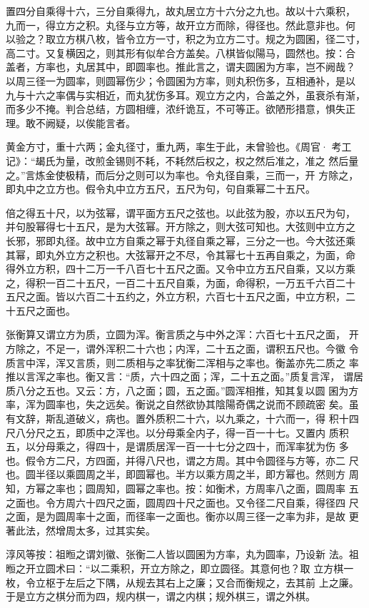 \documentclass[a4paper,12pt,UTF8,twoside]{ctexbook}
\begin{document}
置四分自乘得十六，三分自乘得九，故丸居立方十六分之九也。故以十六乘积， 九而一，得立方之积。丸径与立方等，故开立方而除，得径也。然此意非也。何 以验之？取立方棋八枚，皆令立方一寸，积之为立方二寸。规之为圆囷，径二寸， 高二寸。又复横因之，则其形有似牟合方盖矣。八棋皆似陽马，圆然也。按：合 盖者，方率也，丸居其中，即圆率也。推此言之，谓夫圆囷为方率，岂不阙哉？ 以周三径一为圆率，则圆幂伤少；令圆囷为方率，则丸积伤多，互相通补，是以 九与十六之率偶与实相近，而丸犹伤多耳。观立方之内，合盖之外，虽衰杀有渐， 而多少不掩。判合总结，方圆相缠，浓纤诡互，不可等正。欲陋形措意，惧失正 理。敢不阙疑，以俟能言者。

黄金方寸，重十六两；金丸径寸，重九两，率生于此，未曾验也。《周官· 考工记》：“朅氏为量，改煎金锡则不耗，不耗然后权之，权之然后准之，准之 然后量之。”言炼金使极精，而后分之则可以为率也。令丸径自乘，三而一，开 方除之，即丸中之立方也。假令丸中立方五尺，五尺为句，句自乘幂二十五尺。

倍之得五十尺，以为弦幂，谓平面方五尺之弦也。以此弦为股，亦以五尺为句， 并句股幂得七十五尺，是为大弦幂。开方除之，则大弦可知也。大弦则中立方之 长邪，邪即丸径。故中立方自乘之幂于丸径自乘之幂，三分之一也。今大弦还乘 其幂，即丸外立方之积也。大弦幂开之不尽，令其幂七十五再自乘之，为面，命 得外立方积，四十二万一千八百七十五尺之面。又令中立方五尺自乘，又以方乘 之，得积一百二十五尺，一百二十五尺自乘，为面，命得积，一万五千六百二十 五尺之面。皆以六百二十五约之，外立方积，六百七十五尺之面，中立方积，二 十五尺之面也。

张衡算又谓立方为质，立圆为浑。衡言质之与中外之浑：六百七十五尺之面， 开方除之，不足一，谓外浑积二十六也；内浑，二十五之面，谓积五尺也。今徽 令质言中浑，浑又言质，则二质相与之率犹衡二浑相与之率也。衡盖亦先二质之 率推以言浑之率也。衡又言：“质，六十四之面；浑，二十五之面。”质复言浑， 谓居质八分之五也。又云：方，八之面；圆，五之面。”圆浑相推，知其复以圆 囷为方率，浑为圆率也，失之远矣。衡说之自然欲协其陰陽奇偶之说而不顾疏密 矣。虽有文辞，斯乱道破义，病也。置外质积二十六，以九乘之，十六而一，得 积十四尺八分尺之五，即质中之浑也。以分母乘全内子，得一百一十七。又置内 质积五，以分母乘之，得四十，是谓质居浑一百一十七分之四十，而浑率犹为伤 多也。假令方二尺，方四面，并得八尺也，谓之方周。其中令圆径与方等，亦二 尺也。圆半径以乘圆周之半，即圆幂也。半方以乘方周之半，即方幂也。然则方 周知，方幂之率也；圆周知，圆幂之率也。按：如衡术，方周率八之面，圆周率 五之面也。令方周六十四尺之面，圆周四十尺之面也。又令径二尺自乘，得径四 尺之面，是为圆周率十之面，而径率一之面也。衡亦以周三径一之率为非，是故 更著此法，然增周太多，过其实矣。

淳风等按：祖暅之谓刘徽、张衡二人皆以圆囷为方率，丸为圆率，乃设新 法。祖暅之开立圆术曰：“以二乘积，开立方除之，即立圆径。其意何也？取 立方棋一枚，令立枢于左后之下隅，从规去其右上之廉；又合而衡规之，去其前 上之廉。于是立方之棋分而为四，规内棋一，谓之内棋；规外棋三，谓之外棋。
\end{document}
